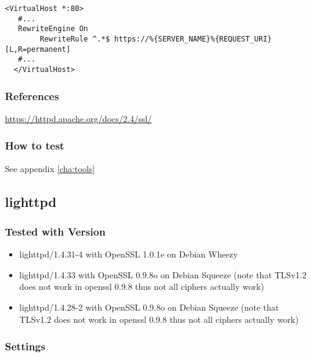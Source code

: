 \begin{lstlisting}[breaklines]
  <VirtualHost *:80>
   #...
   RewriteEngine On
        RewriteRule ^.*$ https://%{SERVER_NAME}%{REQUEST_URI} [L,R=permanent]
   #...
  </VirtualHost>
\end{lstlisting}


\subsubsection{References}
\url{https://httpd.apache.org/docs/2.4/ssl/}


\subsubsection{How to test}

See appendix \ref{cha:tools}



\subsection{lighttpd}



\subsubsection{Tested with Version}
\begin{itemize}
\item lighttpd/1.4.31-4 with OpenSSL 1.0.1e on Debian Wheezy
\item lighttpd/1.4.33 with OpenSSL 0.9.8o on Debian Squeeze (note that TLSv1.2 does not work in openssl 0.9.8 thus not all ciphers actually work)
\item lighttpd/1.4.28-2 with OpenSSL 0.9.8o on Debian Squeeze (note that TLSv1.2 does not work in openssl 0.9.8 thus not all ciphers actually work)
\end{itemize}


\subsubsection{Settings}


